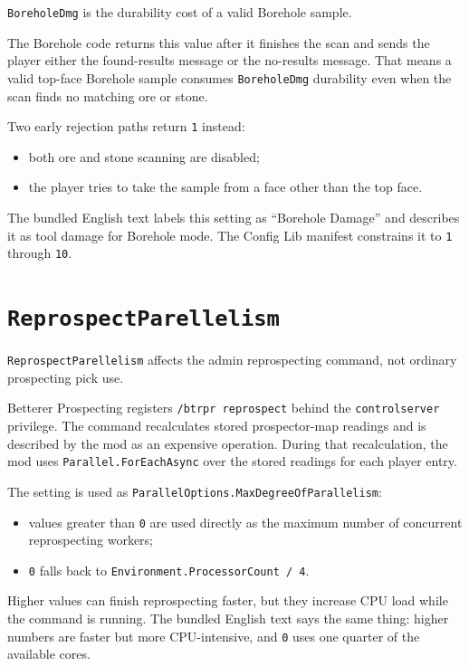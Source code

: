 \documentclass[
  11pt,
  letterpaper,
  titlepage]{article}
\providecommand{\tightlist}{%
  \setlength{\itemsep}{0pt}\setlength{\parskip}{0pt}}
\begin{document}
\texttt{BoreholeDmg} is the durability cost of a valid Borehole sample.

The Borehole code returns this value after it finishes the scan and
sends the player either the found-results message or the no-results
message. That means a valid top-face Borehole sample consumes
\texttt{BoreholeDmg} durability even when the scan finds no matching ore
or stone.

Two early rejection paths return \texttt{1} instead:

\begin{itemize}
\tightlist
\item
  both ore and stone scanning are disabled;
\item
  the player tries to take the sample from a face other than the top
  face.
\end{itemize}

The bundled English text labels this setting as ``Borehole Damage'' and
describes it as tool damage for Borehole mode. The Config Lib manifest
constrains it to \texttt{1} through \texttt{10}.

\section{\texorpdfstring{\texttt{ReprospectParellelism}}{ReprospectParellelism}}\label{reprospectparellelism}

\texttt{ReprospectParellelism} affects the admin reprospecting command,
not ordinary prospecting pick use.

Betterer Prospecting registers \texttt{/btrpr\ reprospect} behind the
\texttt{controlserver} privilege. The command recalculates stored
prospector-map readings and is described by the mod as an expensive
operation. During that recalculation, the mod uses
\texttt{Parallel.ForEachAsync} over the stored readings for each player
entry.

The setting is used as \texttt{ParallelOptions.MaxDegreeOfParallelism}:

\begin{itemize}
\tightlist
\item
  values greater than \texttt{0} are used directly as the maximum number
  of concurrent reprospecting workers;
\item
  \texttt{0} falls back to \texttt{Environment.ProcessorCount\ /\ 4}.
\end{itemize}

Higher values can finish reprospecting faster, but they increase CPU
load while the command is running. The bundled English text says the
same thing: higher numbers are faster but more CPU-intensive, and
\texttt{0} uses one quarter of the available cores.
\end{document}
